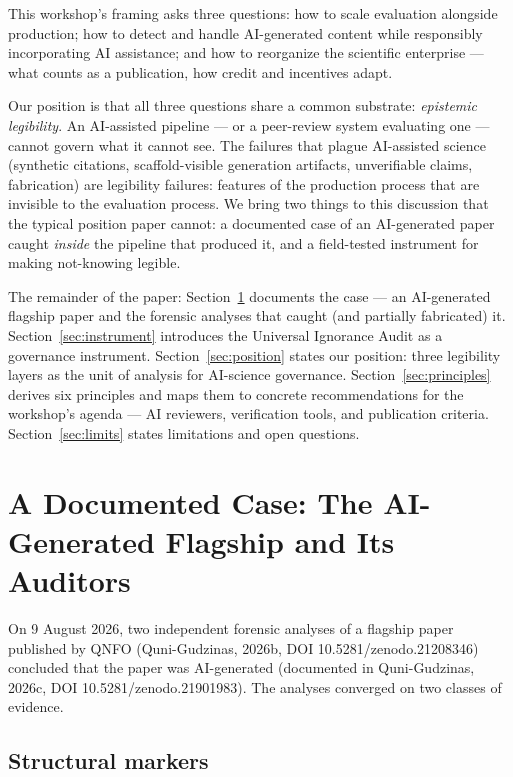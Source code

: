 \documentclass{article}
\begin{document}
This workshop's framing asks three questions: how to scale evaluation alongside production; how to detect and handle AI-generated content while responsibly incorporating AI assistance; and how to reorganize the scientific enterprise --- what counts as a publication, how credit and incentives adapt.

Our position is that all three questions share a common substrate: \emph{epistemic legibility}. An AI-assisted pipeline --- or a peer-review system evaluating one --- cannot govern what it cannot see. The failures that plague AI-assisted science (synthetic citations, scaffold-visible generation artifacts, unverifiable claims, fabrication) are legibility failures: features of the production process that are invisible to the evaluation process. We bring two things to this discussion that the typical position paper cannot: a documented case of an AI-generated paper caught \emph{inside} the pipeline that produced it, and a field-tested instrument for making not-knowing legible.

The remainder of the paper: Section~\ref{sec:case} documents the case --- an AI-generated flagship paper and the forensic analyses that caught (and partially fabricated) it. Section~\ref{sec:instrument} introduces the Universal Ignorance Audit as a governance instrument. Section~\ref{sec:position} states our position: three legibility layers as the unit of analysis for AI-science governance. Section~\ref{sec:principles} derives six principles and maps them to concrete recommendations for the workshop's agenda --- AI reviewers, verification tools, and publication criteria. Section~\ref{sec:limits} states limitations and open questions.

\section{A Documented Case: The AI-Generated Flagship and Its Auditors}
\label{sec:case}

On 9 August 2026, two independent forensic analyses of a flagship paper published by QNFO (Quni-Gudzinas, 2026b, DOI 10.5281/zenodo.21208346) concluded that the paper was AI-generated (documented in Quni-Gudzinas, 2026c, DOI 10.5281/zenodo.21901983). The analyses converged on two classes of evidence.

\subsection{Structural markers}
\end{document}
